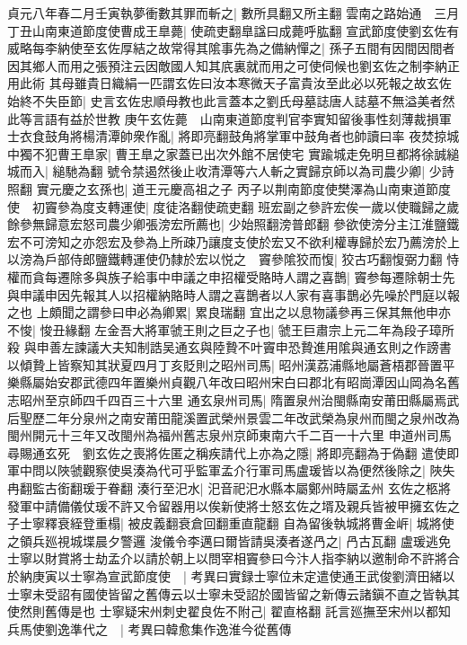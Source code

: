 貞元八年春二月壬寅執夢衝數其罪而斬之|{
	數所具翻又所主翻}
雲南之路始通　三月丁丑山南東道節度使曹成王臯薨|{
	使疏吏翻臯諡曰成薨呼肱翻}
宣武節度使劉玄佐有威略每李納使至玄佐厚結之故常得其隂事先為之備納憚之|{
	孫子五間有因間因間者因其鄉人而用之張預注云因敵國人知其㡳裏就而用之可使伺候也劉玄佐之制李納正用此術}
其母雖貴日織絹一匹謂玄佐曰汝本寒微天子富貴汝至此必以死報之故玄佐始終不失臣節|{
	史言玄佐忠順母教也此言蓋本之劉氏母墓誌唐人誌墓不無溢美者然此等言語有益於世教}
庚午玄佐薨　山南東道節度判官李實知留後事性刻薄裁損軍士衣食鼓角將楊清潭帥衆作亂|{
	將即亮翻鼓角將掌軍中鼓角者也帥讀曰率}
夜焚掠城中獨不犯曹王臯家|{
	曹王臯之家蓋已出次外館不居使宅}
實踰城走免明旦都將徐誠縋城而入|{
	縋馳為翻}
號令禁遏然後止收清潭等六人斬之實歸京師以為司農少卿|{
	少詩照翻}
實元慶之玄孫也|{
	道王元慶高祖之子}
丙子以荆南節度使樊澤為山南東道節度使　初竇參為度支轉運使|{
	度徒洛翻使疏吏翻}
班宏副之參許宏俟一歲以使職歸之歲餘參無歸意宏怒司農少卿張滂宏所薦也|{
	少始照翻滂普郎翻}
參欲使滂分主江淮鹽鐵宏不可滂知之亦怨宏及參為上所疎乃讓度支使於宏又不欲利權專歸於宏乃薦滂於上以滂為戶部侍郎鹽鐵轉運使仍隸於宏以悦之　竇參隂狡而愎|{
	狡古巧翻愎弼力翻}
恃權而貪每遷除多與族子給事中申議之申招權受賂時人謂之喜鵲|{
	竇参每遷除朝士先與申議申因先報其人以招權納賂時人謂之喜鵲者以人家有喜事鵲必先噪於門庭以報之也}
上頗聞之謂參曰申必為卿累|{
	累良瑞翻}
宜出之以息物議參再三保其無他申亦不悛|{
	悛丑緣翻}
左金吾大將軍虢王則之巨之子也|{
	虢王巨肅宗上元二年為段子璋所殺}
與申善左諫議大夫知制誥吴通玄與陸贄不叶竇申恐贄進用隂與通玄則之作謗書以傾贄上皆察知其狀夏四月丁亥貶則之昭州司馬|{
	昭州漢荔浦縣地屬蒼梧郡晉置平樂縣屬始安郡武德四年置樂州貞觀八年改曰昭州宋白曰郡北有昭崗潭因山岡為名舊志昭州至京師四千四百三十六里}
通玄泉州司馬|{
	隋置泉州治閩縣南安莆田縣屬焉武后聖歷二年分泉州之南安莆田龍溪置武榮州景雲二年改武榮為泉州而閩之泉州改為閩州開元十三年又改閩州為福州舊志泉州京師東南六千二百一十六里}
申道州司馬尋賜通玄死　劉玄佐之喪將佐匿之稱疾請代上亦為之隱|{
	將即亮翻為于偽翻}
遣使即軍中問以陜虢觀察使吳湊為代可乎監軍孟介行軍司馬盧瑗皆以為便然後除之|{
	陜失冉翻監古銜翻瑗于眷翻}
湊行至汜水|{
	汜音祀汜水縣本屬鄭州時屬孟州}
玄佐之柩將發軍中請備儀仗瑗不許又令留器用以俟新使將士怒玄佐之壻及親兵皆被甲擁玄佐之子士寧釋衰絰登重榻|{
	被皮義翻衰倉回翻重直龍翻}
自為留後執城將曹金㟁|{
	城將使之領兵廵視城堞晨夕警邏}
浚儀令李邁曰爾皆請吳湊者遂冎之|{
	冎古瓦翻}
盧瑗逃免士寧以財賞將士劫孟介以請於朝上以問宰相竇參曰今汴人指李納以邀制命不許將合於納庚寅以士寧為宣武節度使　|{
	考異曰實録士寧位未定遣使通王武俊劉濟田緒以士寧未受詔有國使皆留之舊傳云以士寧未受詔於國皆留之新傳云諸鎭不直之皆執其使然則舊傳是也}
士寧疑宋州刺史翟良佐不附己|{
	翟直格翻}
託言廵撫至宋州以都知兵馬使劉逸準代之　|{
	考異曰韓愈集作逸淮今從舊傳}
